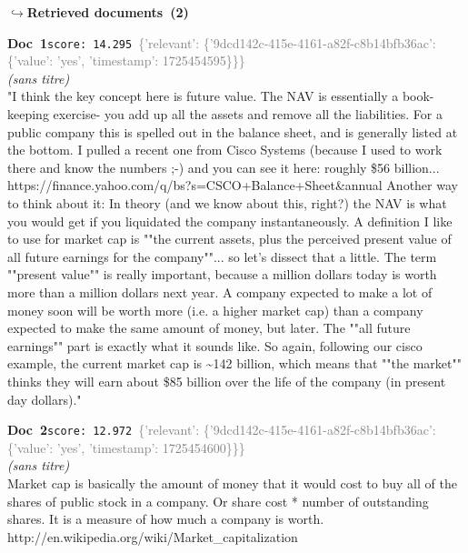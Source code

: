 \documentclass[a4paper,11pt]{article}
\begin{document}
\noindent\hfill{\footnotesize\textcolor{doccolor}{\textbf{$\hookrightarrow$\enspace Retrieved documents~(2)}}}
\begin{docenv}
{\footnotesize\textcolor{doccolor}{\textbf{Doc~1}}}\hfill{\tiny\texttt{score:~14.295}}\ {\tiny\textcolor{gray}{\{'relevant': \{'9dcd142c-415e-4161-a82f-c8b14bfb36ac': \{'value': 'yes', 'timestamp': 1725454595\}\}\}}}\\[3pt]
{\small\textit{(sans titre)}}\\[2pt]
\vspace{2pt}
{\footnotesize 
"I think the key concept here is future value.  The NAV is essentially a book-keeping exercise- you add up all the assets and remove all the liabilities.  For a public company this is spelled out in the balance sheet, and is generally listed at the bottom.  I pulled a recent one from Cisco Systems (because I used to work there and know the numbers  ;-) and you can see it here: roughly \$56 billion... https://finance.yahoo.com/q/bs?s=CSCO+Balance+Sheet\&annual  Another way to think about it: In theory (and we know about this, right?) the NAV is what you would get if you liquidated the company instantaneously.  A definition I like to use for market cap is ""the current assets, plus the perceived present value of all future earnings for the company""... so let's dissect that a little.  The term ""present value"" is really important, because a million dollars today is worth more than a million dollars next year.  A company expected to make a lot of money soon will be worth more (i.e. a higher market cap) than a company expected to make the same amount of money, but later.  The ""all future earnings"" part is exactly what it sounds like.  So again, following our cisco example, the current market cap is \textasciitilde{}142 billion, which means that ""the market"" thinks they will earn about \$85 billion over the life of the company (in present day dollars)."}
\end{docenv}
\begin{docenv}
{\footnotesize\textcolor{doccolor}{\textbf{Doc~2}}}\hfill{\tiny\texttt{score:~12.972}}\ {\tiny\textcolor{gray}{\{'relevant': \{'9dcd142c-415e-4161-a82f-c8b14bfb36ac': \{'value': 'yes', 'timestamp': 1725454600\}\}\}}}\\[3pt]
{\small\textit{(sans titre)}}\\[2pt]
\vspace{2pt}
{\footnotesize 
Market cap is basically the amount of money that it would cost to buy all of the shares of public stock in a company.  Or  share cost * number of outstanding shares. It is a measure of how much a company is worth. http://en.wikipedia.org/wiki/Market\_capitalization}
\end{docenv}
\end{document}

